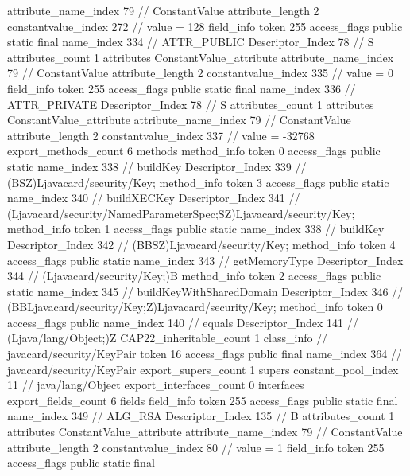 {{{{{{{					attribute_name_index	79		// ConstantValue
					attribute_length	2
					constantvalue_index	272		// value = 128
				}
				}
			}
			field_info {
				token	255
				access_flags	public static final
				name_index	334		// ATTR_PUBLIC
				Descriptor_Index	78		// S
				attributes_count	1
				attributes {
				ConstantValue_attribute {
					attribute_name_index	79		// ConstantValue
					attribute_length	2
					constantvalue_index	335		// value = 0
				}
				}
			}
			field_info {
				token	255
				access_flags	public static final
				name_index	336		// ATTR_PRIVATE
				Descriptor_Index	78		// S
				attributes_count	1
				attributes {
				ConstantValue_attribute {
					attribute_name_index	79		// ConstantValue
					attribute_length	2
					constantvalue_index	337		// value = -32768
				}
				}
			}
			}
			export_methods_count	6
			methods {
				method_info {
					token	0
					access_flags	public static
					name_index	338		// buildKey
					Descriptor_Index	339		// (BSZ)Ljavacard/security/Key;
				}
				method_info {
					token	3
					access_flags	public static
					name_index	340		// buildXECKey
					Descriptor_Index	341		// (Ljavacard/security/NamedParameterSpec;SZ)Ljavacard/security/Key;
				}
				method_info {
					token	1
					access_flags	public static
					name_index	338		// buildKey
					Descriptor_Index	342		// (BBSZ)Ljavacard/security/Key;
				}
				method_info {
					token	4
					access_flags	public static
					name_index	343		// getMemoryType
					Descriptor_Index	344		// (Ljavacard/security/Key;)B
				}
				method_info {
					token	2
					access_flags	public static
					name_index	345		// buildKeyWithSharedDomain
					Descriptor_Index	346		// (BBLjavacard/security/Key;Z)Ljavacard/security/Key;
				}
				method_info {
					token	0
					access_flags	public
					name_index	140		// equals
					Descriptor_Index	141		// (Ljava/lang/Object;)Z
				}
			}
			CAP22_inheritable_count	1
		}
		class_info {		// javacard/security/KeyPair
			token	16
			access_flags	public final
			name_index	364		// javacard/security/KeyPair
			export_supers_count	1
			supers {
				constant_pool_index	11		// java/lang/Object
			}
			export_interfaces_count	0
			interfaces {
			}
			export_fields_count	6
			fields {
			field_info {
				token	255
				access_flags	public static final
				name_index	349		// ALG_RSA
				Descriptor_Index	135		// B
				attributes_count	1
				attributes {
				ConstantValue_attribute {
					attribute_name_index	79		// ConstantValue
					attribute_length	2
					constantvalue_index	80		// value = 1
				}
				}
			}
			field_info {
				token	255
				access_flags	public static final
}}}}}

